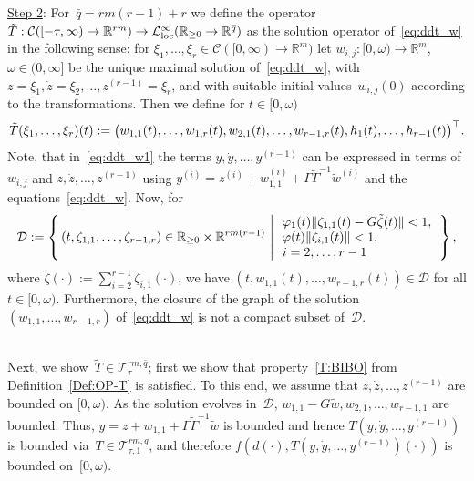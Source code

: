\documentclass[ envcountsect, envcountsame]{svjour3}
\newcommand{\setdef}[2]{\left\{\, #1\, \left|\, \vphantom{#1} #2 \right.\right\}}
\newcommand{\R}{\mathbb{R}}
\newcommand{\cC}{\mathcal{C}}
\newcommand{\cD}{\mathcal{D}}
\newcommand{\cL}{\mathcal{L}}
\newcommand{\cT}{\mathcal{T}}
\newcommand{\vp}{\varphi}
\newcommand{\rp}{\mathbb{R}_{\geq 0}}
\begin{document}
%
\underline{Step 2}: 
For~$\bar q = rm(r-1) + r$ we define the operator $\tilde T : \cC([-\tau,\infty) \to \R^{rm}) \to \cL_{\rm loc}^\infty(\rp \to \R^{\bar q})$ as the solution operator of~\eqref{eq:ddt_w} in the following sense: 
for $\xi_1,\ldots,\xi_r \in \cC([0,\infty) \to \R^m)$ let $w_{i,j} : [0,\omega) \to \R^m$, $\omega \in (0,\infty]$ be the unique maximal solution of~\eqref{eq:ddt_w},
with $z= \xi_1, \dot z = \xi_2, \ldots, z^{(r-1)} = \xi_r $, and with suitable initial values~$w_{i,j}(0)$ according to the transformations. 
Then we define for $t \in [0,\omega)$
\begin{equation*}
\begin{small}
\tilde T(\xi_1,\ldots,\xi_r)(t) := \big( w_{1,1}(t),\ldots,w_{1,r}(t),w_{2,1}(t),\ldots,w_{r-1,r}(t),h_1(t),\ldots,h_{r-1}(t) \big)^\top. %
\end{small}
\end{equation*}
%
Note, that in~\eqref{eq:ddt_w1} the terms $y,\dot y,\ldots, y^{(r-1)}$ can be expressed in terms of $w_{i,j}$ and $z,\dot z,\ldots, z^{(r-1)}$ 
using $y^{(i)} = z^{(i)} + w_{1,1}^{(i)} + \Gamma \tilde \Gamma^{-1} \tilde w^{(i)}$ and the equations~\eqref{eq:ddt_w}.
%
Now, for
\begin{equation*}
\begin{aligned}
\cD := 
\setdef{ 
(t,\zeta_{1,1},\ldots,\zeta_{r-1,r})  \in \rp \times \R^{rm(r-1)}   }
{ \begin{array}{l}
 \vp_1(t) \| \zeta_{1,1}(t) - G \tilde  \zeta(t) \| < 1, \\
\vp(t) \| \zeta_{i,1}(t) \| < 1, \\ 
i=2,\ldots,r-1 
\end{array}
},
\end{aligned}
\end{equation*}
where $\tilde \zeta(\cdot) := \sum_{i=2}^{r-1}\zeta_{i,1}(\cdot)$, we have $(t,w_{1,1}(t),\ldots,w_{r-1,r}(t)) \in \cD$ for all $t \in [0,\omega)$. 
Furthermore, the closure of the graph of the solution $(w_{1,1},\ldots,w_{r-1,r})$ of~\eqref{eq:ddt_w} is not a compact subset of~$\cD$.

\ \\
Next, we show~$\tilde T \in \cT^{rm,\bar q}_{\tau}$; first we show that property~\ref{T:BIBO} from Definition~\ref{Def:OP-T} is satisfied.
To this end, we assume that $z,\dot z,\ldots, z^{(r-1)}$ are bounded on $[0,\omega)$. 
As the solution evolves in~$\cD$, $w_{1,1}- G \tilde w, w_{2,1},\ldots,w_{r-1,1}$ are bounded. Thus, $y = z + w_{1,1} + \Gamma \tilde \Gamma^{-1} \tilde w$ is bounded and hence $T\left(y,\dot y,\ldots, y^{(r-1)}\right)$ is bounded via~$T \in \cT^{rm,q}_{\tau,1}$, and therefore $f\left(d(\cdot),T\left(y,\dot y,\ldots, y^{(r-1)}\right)(\cdot)\right)$ is bounded on~$[0,\omega)$.
%
\end{document}
